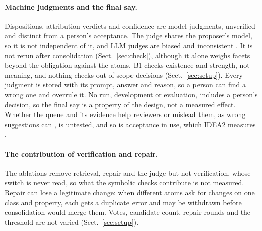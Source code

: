 \paragraph{Machine judgments and the final say.}
Dispositions, attribution verdicts and confidence are model judgments, unverified and distinct from a person's
acceptance.
The judge shares the proposer's model, so it is not independent of it, and \ac{LLM} judges are biased and
inconsistent \cite{zheng2023judge,wang2024fair,stureborg2024inconsistent,liu2023geval}.
It is not rerun after consolidation (Sect.~\ref{sec:check}), although it alone weighs facets beyond the obligation %
against the atoms. %
B1 checks existence and strength, not meaning, and nothing checks out-of-scope decisions (Sect.~\ref{sec:setup}). %
Every judgment is stored with its prompt, answer and reason, so a person can find a wrong one and overrule it.
No run, development or evaluation, includes a person's decision, so the final say is a property of the design, not
a measured effect.
Whether the queue and its evidence help reviewers or mislead them, as wrong suggestions can
\cite{lippolis2025oeassist}, is untested, and so is acceptance in use, which IDEA2 measures \cite{alharbi2027idea2}.

\paragraph{The contribution of verification and repair.}
The ablations remove retrieval, repair and the judge but not verification, whose switch is never read, so what the %
symbolic checks contribute is not measured.
Repair can lose a legitimate change: when different atoms ask for changes on one class and property, each gets a %
duplicate error and may be withdrawn before consolidation would merge them.
Votes, candidate count, repair rounds and the threshold are not varied (Sect.~\ref{sec:setup}). %

